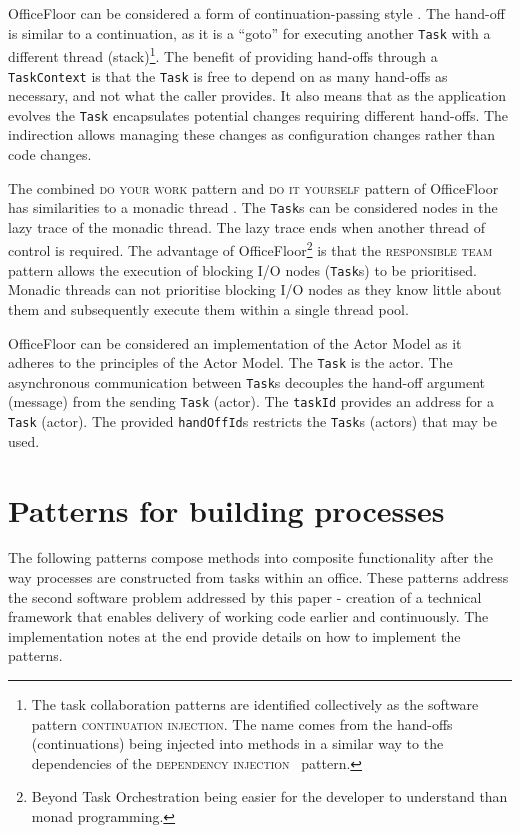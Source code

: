 \documentclass[prodmode]{style/acmlarge}
\begin{document}
OfficeFloor can be considered a form of continuation-passing style
\cite{continuations}.  The hand-off is similar to a continuation, as it is a
``goto'' for executing another \texttt{Task} with a different thread
(stack)\footnote{The task collaboration patterns are identified collectively as
the software pattern \textsc{continuation injection}.  The name comes from the
hand-offs (continuations) being injected into methods in a similar way to the
dependencies of the \textsc{dependency injection}~\cite{ioc} pattern.}.  The
benefit of providing hand-offs through a \texttt{TaskContext} is that the
\texttt{Task} is free to depend on as many hand-offs as necessary, and not what
the caller provides.  It also means that as the application evolves the
\texttt{Task} encapsulates potential changes requiring different hand-offs.  The
indirection allows managing these changes as configuration changes rather than
code changes.

The combined \textsc{do your work} pattern and \textsc{do it yourself} pattern
of OfficeFloor has similarities to a monadic thread \cite{monadic-thread}.  The
\texttt{Task}s can be considered nodes in the lazy trace of the monadic thread. 
The lazy trace ends when another thread of control is required.  The advantage of
OfficeFloor\footnote{Beyond Task Orchestration being easier for the developer to
understand than monad programming.} is that the \textsc{responsible team}
pattern allows the execution of blocking I/O nodes (\texttt{Task}s) to be
prioritised.  Monadic threads can not prioritise blocking I/O nodes as they know
little about them and subsequently execute them within a single thread pool.

OfficeFloor can be considered an implementation of the Actor Model \cite{actors}
as it adheres to the principles of the Actor Model.  The \texttt{Task} is the
actor.  The asynchronous communication between \texttt{Task}s decouples the
hand-off argument (message) from the sending \texttt{Task} (actor).  The
\texttt{taskId} provides an address for a \texttt{Task} (actor).  The provided
\texttt{handOffId}s restricts the \texttt{Task}s (actors) that may be used.




\section{Patterns for building processes}

The following patterns compose methods into composite functionality after the
way processes are constructed from tasks within an office.  These patterns
address the second software problem addressed by this paper - creation of a
technical framework that enables delivery of working code earlier and
continuously.  The implementation notes at the end provide details on how to
implement the patterns.
\end{document}
